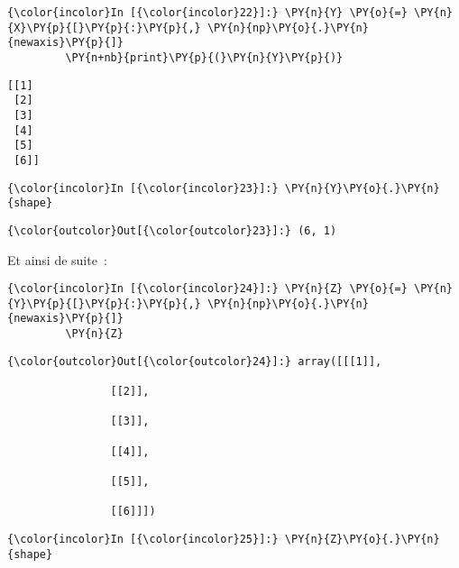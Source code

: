     \begin{Verbatim}[commandchars=\\\{\}]
{\color{incolor}In [{\color{incolor}22}]:} \PY{n}{Y} \PY{o}{=} \PY{n}{X}\PY{p}{[}\PY{p}{:}\PY{p}{,} \PY{n}{np}\PY{o}{.}\PY{n}{newaxis}\PY{p}{]}
         \PY{n+nb}{print}\PY{p}{(}\PY{n}{Y}\PY{p}{)}
\end{Verbatim}


    \begin{Verbatim}[commandchars=\\\{\}]
[[1]
 [2]
 [3]
 [4]
 [5]
 [6]]

    \end{Verbatim}

    \begin{Verbatim}[commandchars=\\\{\}]
{\color{incolor}In [{\color{incolor}23}]:} \PY{n}{Y}\PY{o}{.}\PY{n}{shape}
\end{Verbatim}


\begin{Verbatim}[commandchars=\\\{\}]
{\color{outcolor}Out[{\color{outcolor}23}]:} (6, 1)
\end{Verbatim}
            
    Et ainsi de suite~:

    \begin{Verbatim}[commandchars=\\\{\}]
{\color{incolor}In [{\color{incolor}24}]:} \PY{n}{Z} \PY{o}{=} \PY{n}{Y}\PY{p}{[}\PY{p}{:}\PY{p}{,} \PY{n}{np}\PY{o}{.}\PY{n}{newaxis}\PY{p}{]}
         \PY{n}{Z}
\end{Verbatim}


\begin{Verbatim}[commandchars=\\\{\}]
{\color{outcolor}Out[{\color{outcolor}24}]:} array([[[1]],
         
                [[2]],
         
                [[3]],
         
                [[4]],
         
                [[5]],
         
                [[6]]])
\end{Verbatim}
            
    \begin{Verbatim}[commandchars=\\\{\}]
{\color{incolor}In [{\color{incolor}25}]:} \PY{n}{Z}\PY{o}{.}\PY{n}{shape}
\end{Verbatim}


